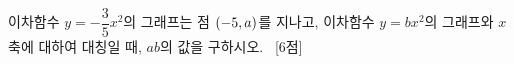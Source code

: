 이차함수 $y=-\dfrac{3}{5}x^2$의 그래프는 점 $(-5{,}\mkern3mu\mathopen{}a)$를 지나고, 이차함수 $y=bx^2$의 그래프와 $x$축에 대하여 대칭일 때, $ab$의 값을 구하시오. ~\mbox{\mbox{[6점]}}
